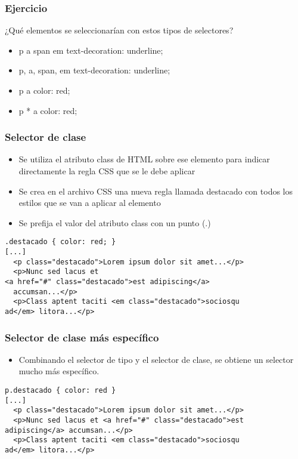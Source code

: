\begin{frame}
\frametitle{Ejercicio}

¿Qué elementos se seleccionarían con estos tipos de selectores?

\begin{itemize}
  \item p a span em { text-decoration: underline; }
  \item p, a, span, em { text-decoration: underline; }
  \item p a { color: red; }
  \item p * a { color: red; }
\end{itemize}

\end{frame}


\begin{frame}[fragile]
\frametitle{Selector de clase}

\begin{itemize}
  \item Se utiliza el atributo class de HTML sobre ese elemento para indicar directamente la regla CSS que se le debe aplicar
  \item Se crea en el archivo CSS una nueva regla llamada destacado con todos los estilos que se van a aplicar al elemento
  \item Se prefija el valor del atributo class con un punto (.)
\end{itemize}

{\footnotesize
\begin{verbatim}
.destacado { color: red; }
[...]
  <p class="destacado">Lorem ipsum dolor sit amet...</p>
  <p>Nunc sed lacus et 
<a href="#" class="destacado">est adipiscing</a>
  accumsan...</p>
  <p>Class aptent taciti <em class="destacado">sociosqu
ad</em> litora...</p>
\end{verbatim}
}

\end{frame}


\begin{frame}[fragile]
\frametitle{Selector de clase más específico}

\begin{itemize}
  \item Combinando el selector de tipo y el selector de clase, se obtiene un selector mucho más específico.
\end{itemize}

{\footnotesize
\begin{verbatim}
p.destacado { color: red }
[...]
  <p class="destacado">Lorem ipsum dolor sit amet...</p>
  <p>Nunc sed lacus et <a href="#" class="destacado">est
adipiscing</a> accumsan...</p>
  <p>Class aptent taciti <em class="destacado">sociosqu
ad</em> litora...</p>
\end{verbatim}
}

\end{frame}

